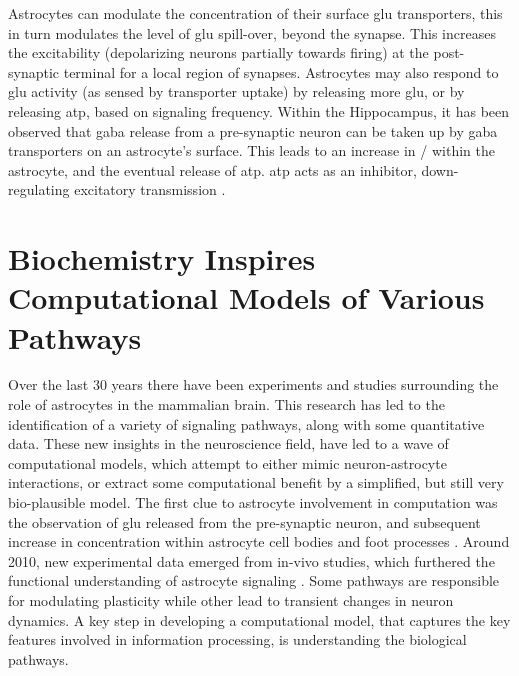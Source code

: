     Astrocytes can modulate the concentration of their surface glu transporters,
    this in turn modulates the level of glu spill-over, beyond the synapse. This
    increases the excitability (depolarizing neurons partially towards firing)
    at the post-synaptic terminal for a local region of synapses. Astrocytes may
    also respond to \gls{glu} activity (as sensed by transporter uptake) by
    releasing more \gls{glu}, or by releasing \gls{atp}, based on signaling
    frequency. Within the Hippocampus, it has been observed that \gls{gaba}
    release from a pre-synaptic neuron can be taken up by \gls{gaba}
    transporters on an astrocyte's surface. This leads to an increase in \na /
    \ca within the astrocyte, and the eventual release of \gls{atp}. \Gls{atp}
    acts as an inhibitor, down-regulating excitatory transmission
    \parencite{mederos_2018}.
        

    \section{Biochemistry Inspires Computational Models of Various Pathways}
    Over the last 30 years there have been experiments and studies surrounding the
    role of astrocytes in the mammalian brain. This research has led to the
    identification of a variety of signaling pathways, along with some
    quantitative data. These new insights in the neuroscience field, have led
    to a wave of computational models, which attempt to either mimic
    neuron-astrocyte interactions, or extract some computational benefit by a
    simplified, but still very bio-plausible model. The first clue to astrocyte
    involvement in computation was the observation of \gls{glu} released from
    the pre-synaptic neuron, and subsequent increase in \ca concentration
    within astrocyte cell bodies and foot processes \parencite{manninen_2018}. Around
    2010, new experimental data emerged from in-vivo studies, which furthered
    the functional understanding of astrocyte signaling
    \parencite{manninen_2018}. Some pathways are responsible for modulating
    plasticity while other lead to transient changes in neuron dynamics. A key
    step in developing a computational model, that captures the key features
    involved in information processing, is understanding the biological
    pathways.


